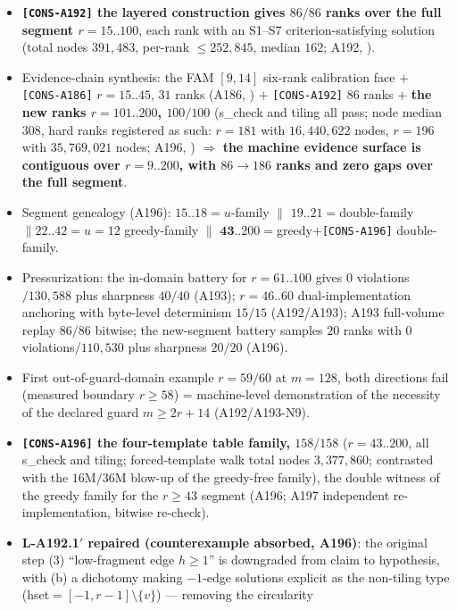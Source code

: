 \begin{itemize}
\item \textbf{\texttt{[CONS-A192]} the layered construction gives $86/86$
ranks over the full segment $r=15..100$}, each rank with an S1--S7
criterion-satisfying solution (total nodes $391{,}483$, per-rank
$\le252{,}845$, median $162$; A192, ).
\item Evidence-chain synthesis: the FAM $[9,14]$ six-rank calibration face
$+$ \texttt{[CONS-A186]} $r=15..45$, $31$ ranks (A186, )
$+$ \texttt{[CONS-A192]} $86$ ranks $+$ \textbf{the new ranks
$r=101..200$, $100/100$} (s\_check and tiling all pass; node median $308$,
hard ranks registered as such: $r=181$ with $16{,}440{,}622$ nodes,
$r=196$ with $35{,}769{,}021$ nodes; A196, )
$\Rightarrow$ \textbf{the machine evidence surface is contiguous over
$r=9..200$, with $86\to186$ ranks and zero gaps over the full segment}.
\item Segment genealogy (A196): $15..18=u$-family $\parallel$
$19..21=$double-family $\parallel 22..42=u{=}12$ greedy-family $\parallel$
$\mathbf{43..200}=$greedy$+$\texttt{[CONS-A196]} double-family.
\item Pressurization: the in-domain battery for $r=61..100$ gives
$0$ violations$/130{,}588$ plus sharpness $40/40$ (A193); $r=46..60$
dual-implementation anchoring with byte-level determinism $15/15$
(A192/A193); A193 full-volume replay $86/86$ bitwise; the new-segment battery
samples $20$ ranks with $0$ violations$/110{,}530$ plus sharpness $20/20$
(A196).
\item First out-of-guard-domain example $r=59/60$ at $m=128$, both directions
fail (measured boundary $r\ge58$) = machine-level demonstration of the
necessity of the declared guard $m\ge2r+14$ (A192/A193-N9).
\item \textbf{\texttt{[CONS-A196]} the four-template table family,
$158/158$} ($r=43..200$, all s\_check and tiling; forced-template walk total
nodes $3{,}377{,}860$; contrasted with the $16$M$/36$M blow-up of the
greedy-free family), the double witness of the greedy family for the
$r\ge43$ segment (A196; A197 independent re-implementation, bitwise
re-check).
\item \textbf{L-A192.1$'$ repaired (counterexample absorbed, A196)}: the
original step (3) ``low-fragment edge $h\ge1$'' is downgraded from claim to
hypothesis, with (b) a dichotomy making $-1$-edge solutions explicit as the
non-tiling type (hset$=[-1,r-1]\setminus\{v\}$) --- removing the circularity

\end{itemize}

